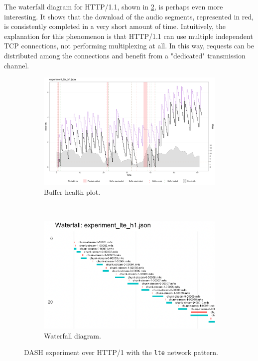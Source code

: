 The waterfall diagram for HTTP/1.1, shown in \ref{fig:eval_nonabr_lte_h1_waterfall}, is perhaps even more interesting. It shows that the download of the audio segments, represented in red, is consistently completed in a very short amount of time. Intuitively, the explanation for this phenomenon is that HTTP/1.1 can use multiple independent TCP connections, not performing multiplexing at all. In this way, requests can be distributed among the connections and benefit from a "dedicated" transmission channel.

\begin{figure}[h]
	\centering
	
	\begin{subfigure}[t]{0.45\textwidth}
		\centering
		\includegraphics[width=\textwidth]{res/eval_nonabr_lte_h1.png}
		\caption{Buffer health plot.}
		\label{fig:eval_nonabr_lte_h1_buffer}
	\end{subfigure}%
	~ 
	\begin{subfigure}[t]{0.45\textwidth}
		\centering
		\includegraphics[width=\textwidth]{res/eval_nonabr_lte_h1_waterfall.png}
		\caption{Waterfall diagram.}
		\label{fig:eval_nonabr_lte_h1_waterfall}
	\end{subfigure}
	
	\caption{DASH experiment over HTTP/1 with the \texttt{lte} network pattern.}
	\label{fig:eval_nonabr_lte_h1}
\end{figure}


